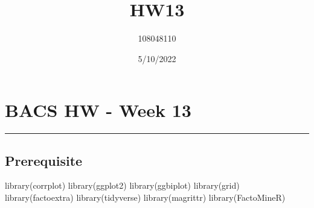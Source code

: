 \documentclass[
]{article}
\title{HW13}
\author{108048110}
\date{5/10/2022}
\newenvironment{Shaded}{\begin{snugshade}}{\end{snugshade}}
\newcommand{\FunctionTok}[1]{\textcolor[rgb]{0.00,0.00,0.00}{#1}}
\newcommand{\NormalTok}[1]{#1}
\begin{document}
\maketitle

\hypertarget{bacs-hw---week-13}{%
\section{BACS HW - Week 13}\label{bacs-hw---week-13}}

\begin{center}\rule{0.5\linewidth}{0.5pt}\end{center}

\hypertarget{prerequisite}{%
\subsection{Prerequisite}\label{prerequisite}}

\begin{Shaded}
\begin{Highlighting}[]
\FunctionTok{library}\NormalTok{(corrplot)}
\FunctionTok{library}\NormalTok{(ggplot2)}
\FunctionTok{library}\NormalTok{(ggbiplot)}
\FunctionTok{library}\NormalTok{(grid)}
\FunctionTok{library}\NormalTok{(factoextra)}
\FunctionTok{library}\NormalTok{(tidyverse)}
\FunctionTok{library}\NormalTok{(magrittr)}
\FunctionTok{library}\NormalTok{(FactoMineR)}
\end{Highlighting}
\end{Shaded}
\end{document}
